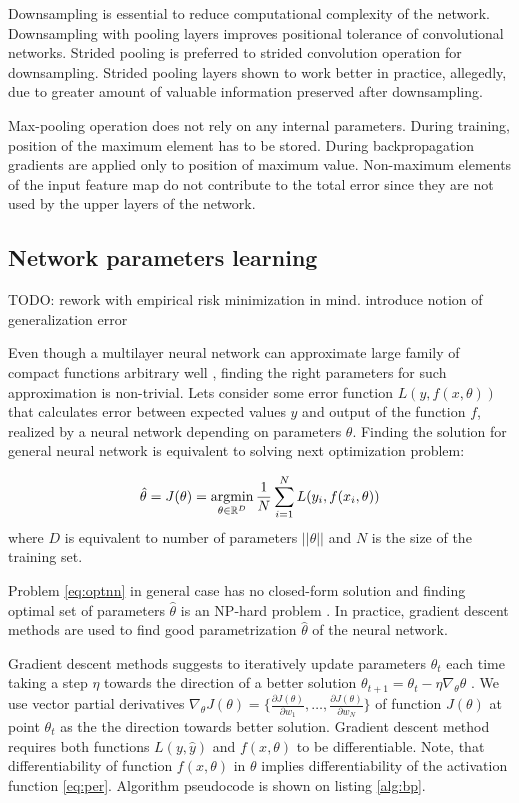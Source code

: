 Downsampling is essential to reduce computational complexity of the network.
Downsampling with pooling layers improves positional tolerance of convolutional networks.
Strided pooling is preferred to strided convolution operation for downsampling. Strided pooling layers shown to work better in practice, allegedly, due to greater amount of valuable information preserved after downsampling.

Max-pooling operation does not rely on any internal parameters. During training, position of the maximum element has to be stored. During backpropagation gradients are applied only to position of maximum value. Non-maximum elements of the input feature map do not contribute to the total error since they are not used by the upper layers of the network.

\subsection{Network parameters learning}
\label{ch:opt}

TODO: rework with empirical risk minimization in mind. introduce notion of generalization error

Even though a multilayer neural network can approximate large family of compact functions arbitrary well \cite{Debao1993}, finding the right parameters for such approximation is non-trivial.
Lets consider some error function $L(y, f(x, \theta))$ that calculates error between expected values $y$ and output of the function $f$, realized by a neural network depending on parameters $\theta$. Finding the solution for general neural network is equivalent to solving next optimization problem:

\begin{equation}\label{eq:optnn}
  \hat{\theta} = J(\theta) = \operatorname*{argmin}_{\theta \in \Bbb{R}^D} \frac{1}{N} \sum_{i=1}^{N} L(y_i, f(x_i, \theta))
\end{equation}
where $D$ is equivalent to number of parameters $||\theta||$ and $N$ is the size of the training set.

Problem \ref{eq:optnn} in general case has no closed-form solution and finding optimal set of parameters $\hat{\theta}$ is an NP-hard problem \cite{Anandkumar16}.
In practice, gradient descent methods are used to find good parametrization $\hat{\theta}$ of the neural network.

Gradient descent methods suggests to iteratively update parameters $\theta_t$ each time taking a step $\eta$ towards the direction of a better solution $\theta_{t+1}=\theta_t - \eta \nabla_\theta \theta$ \cite{Cauchy1847}.
We use vector partial derivatives $\nabla_\theta J(\theta)=\{ \frac{\partial J(\theta)}{\partial w_1}, \ldots, \frac{\partial J(\theta)}{\partial w_N} \}$ of function $J(\theta)$ at point $\theta_t$ as the the direction towards better solution. Gradient descent method requires both functions $L(y, \hat{y})$ and $f(x, \theta)$ to be differentiable. Note, that differentiability of function $f(x, \theta)$ in $\theta$ implies differentiability of the activation function \ref{eq:per}. Algorithm pseudocode is shown on listing \ref{alg:bp}.


